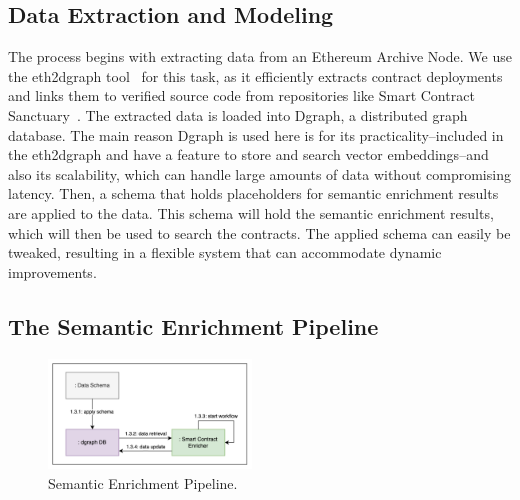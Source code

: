 \subsection{Data Extraction and Modeling}
The process begins with extracting data from an Ethereum Archive Node. We use the eth2dgraph tool~\cite{b7} for this task, as it efficiently extracts contract deployments and links them to verified source code from repositories like Smart Contract Sanctuary~\cite{b10}. The extracted data is loaded into Dgraph, a distributed graph database. The main reason Dgraph is used here is for its practicality--included in the eth2dgraph and have a feature to store and search vector embeddings--and also its scalability, which can handle large amounts of data without compromising latency. Then, a schema that holds placeholders for semantic enrichment results are applied to the data. This schema will hold the semantic enrichment results, which will then be used to search the contracts. The applied schema can easily be tweaked, resulting in a flexible system that can accommodate dynamic improvements.

\subsection{The Semantic Enrichment Pipeline}

\begin{figure}[htbp]
	\centerline{\includegraphics[width=0.48\textwidth]{resources/chapter-3/proses-semantik-enrichment.png}}
	\caption{Semantic Enrichment Pipeline.}\label{fig:pipeline}
\end{figure}

